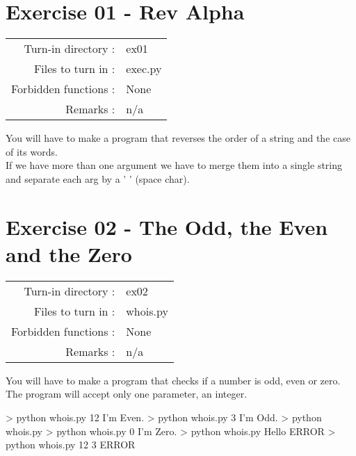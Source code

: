\documentclass[]{article}
\newenvironment{Shaded}{\begin{snugshade}}{\end{snugshade}}
\newcommand{\NormalTok}[1]{\textcolor[rgb]{0.81,0.81,0.76}{#1}}
\begin{document}
\clearpage

\hypertarget{exercise-01---rev-alpha-1}{%
\section{Exercise 01 - Rev Alpha}\label{exercise-01---rev-alpha-1}}

\begin{longtable}[]{@{}rl@{}}
\toprule
\endhead
Turn-in directory : & ex01\tabularnewline
Files to turn in : & exec.py\tabularnewline
Forbidden functions : & None\tabularnewline
Remarks : & n/a\tabularnewline
\bottomrule
\end{longtable}

You will have to make a program that reverses the order of a string and
the case of its words.\\
If we have more than one argument we have to merge them into a single
string and separate each arg by a ' ' (space char).

\begin{Shaded}
\end{Shaded}

\clearpage

\hypertarget{exercise-02---the-odd-the-even-and-the-zero-1}{%
\section{Exercise 02 - The Odd, the Even and the
Zero}\label{exercise-02---the-odd-the-even-and-the-zero-1}}

\begin{longtable}[]{@{}rl@{}}
\toprule
\endhead
Turn-in directory : & ex02\tabularnewline
Files to turn in : & whois.py\tabularnewline
Forbidden functions : & None\tabularnewline
Remarks : & n/a\tabularnewline
\bottomrule
\end{longtable}

You will have to make a program that checks if a number is odd, even or
zero.\\
The program will accept only one parameter, an integer.

\begin{Shaded}
\begin{Highlighting}[]
\NormalTok{> python whois.py 12}
\NormalTok{I'm Even.}
\NormalTok{> python whois.py 3}
\NormalTok{I'm Odd.}
\NormalTok{> python whois.py}
\NormalTok{> python whois.py 0}
\NormalTok{I'm Zero.}
\NormalTok{> python whois.py Hello}
\NormalTok{ERROR}
\NormalTok{> python whois.py 12 3}
\NormalTok{ERROR}
\end{Highlighting}
\end{Shaded}
\end{document}
